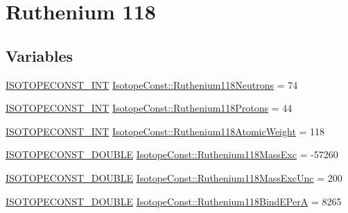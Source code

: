 \hypertarget{group___isotope_const-_ruthenium-_ru118}{}\section{Ruthenium 118}
\label{group___isotope_const-_ruthenium-_ru118}
\subsection*{Variables}
\begin{DoxyCompactItemize}
\item 
\mbox{\hyperlink{group___isotope_const-_macros_ga5f18360b3e99483a35c32d789e62621c}{I\+S\+O\+T\+O\+P\+E\+C\+O\+N\+S\+T\+\_\+\+I\+NT}} \mbox{\hyperlink{group___isotope_const-_ruthenium-_ru118_ga5537d92e9c7688425cb374b542b2a867}{Isotope\+Const\+::\+Ruthenium118\+Neutrons}} = 74
\item 
\mbox{\hyperlink{group___isotope_const-_macros_ga5f18360b3e99483a35c32d789e62621c}{I\+S\+O\+T\+O\+P\+E\+C\+O\+N\+S\+T\+\_\+\+I\+NT}} \mbox{\hyperlink{group___isotope_const-_ruthenium-_ru118_gaad5b89715b5fe0d48e4478032b8cc4ba}{Isotope\+Const\+::\+Ruthenium118\+Protons}} = 44
\item 
\mbox{\hyperlink{group___isotope_const-_macros_ga5f18360b3e99483a35c32d789e62621c}{I\+S\+O\+T\+O\+P\+E\+C\+O\+N\+S\+T\+\_\+\+I\+NT}} \mbox{\hyperlink{group___isotope_const-_ruthenium-_ru118_ga17674995dcc59310191b54f5eff4f43e}{Isotope\+Const\+::\+Ruthenium118\+Atomic\+Weight}} = 118
\item 
\mbox{\hyperlink{group___isotope_const-_macros_ga8f45a7272ce02c0b4c65c44636ed719a}{I\+S\+O\+T\+O\+P\+E\+C\+O\+N\+S\+T\+\_\+\+D\+O\+U\+B\+LE}} \mbox{\hyperlink{group___isotope_const-_ruthenium-_ru118_gadb687d6bcc07da742447199a356800f4}{Isotope\+Const\+::\+Ruthenium118\+Mass\+Exc}} = -\/57260
\item 
\mbox{\hyperlink{group___isotope_const-_macros_ga8f45a7272ce02c0b4c65c44636ed719a}{I\+S\+O\+T\+O\+P\+E\+C\+O\+N\+S\+T\+\_\+\+D\+O\+U\+B\+LE}} \mbox{\hyperlink{group___isotope_const-_ruthenium-_ru118_ga9a1c87963a0895cb70b5c92237f73a00}{Isotope\+Const\+::\+Ruthenium118\+Mass\+Exc\+Unc}} = 200
\item 
\mbox{\hyperlink{group___isotope_const-_macros_ga8f45a7272ce02c0b4c65c44636ed719a}{I\+S\+O\+T\+O\+P\+E\+C\+O\+N\+S\+T\+\_\+\+D\+O\+U\+B\+LE}} \mbox{\hyperlink{group___isotope_const-_ruthenium-_ru118_gaded134288945193862d871ebb44502ac}{Isotope\+Const\+::\+Ruthenium118\+Bind\+E\+PerA}} = 8265
\item 

\end{DoxyCompactItemize}
